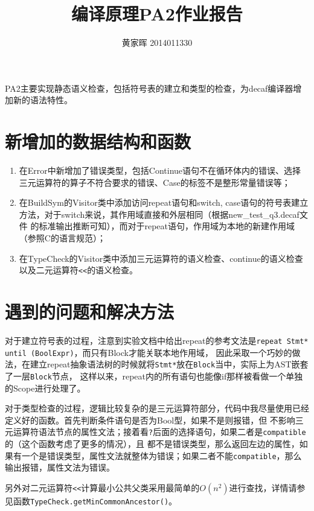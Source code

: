\documentclass[12pt,a4paper]{article}
\title{编译原理PA2作业报告}
\author{黄家晖 2014011330}
\date{}
\begin{document}
\maketitle

PA2主要实现静态语义检查，包括符号表的建立和类型的检查，为decaf编译器增加新的语法特性。

\section{新增加的数据结构和函数}
\begin{enumerate}
\item 在Error中新增加了错误类型，包括Continue语句不在循环体内的错误、选择三元运算符的算子不符合要求的错误、Case的标签不是整形常量错误等；
\item 在BuildSym的Visitor类中添加访问repeat语句和switch, case语句的符号表建立方法，对于switch来说，其作用域直接和外层相同（根据new\_test\_q3.decaf文件
的标准输出推断可知），而对于repeat语句，作用域为本地的新建作用域（参照C的语言规范）；
\item 在TypeCheck的Visitor类中添加三元运算符的语义检查、continue的语义检查以及二元运算符\texttt{<<}的语义检查。

\end{enumerate}

\section{遇到的问题和解决方法}

对于建立符号表的过程，注意到实验文档中给出repeat的参考文法是\texttt{repeat Stmt* until (BoolExpr)}，而只有Block才能关联本地作用域，
因此采取一个巧妙的做法，在建立repeat抽象语法树的时候就将\texttt{Stmt*}放在\texttt{Block}当中，实际上为AST嵌套了一层\texttt{Block}节点，
这样以来，repeat内的所有语句也能像if那样被看做一个单独的Scope进行处理了。

对于类型检查的过程，逻辑比较复杂的是三元运算符部分，代码中我尽量使用已经定义好的函数。首先判断条件语句是否为Bool型，如果不是则报错，但
不影响三元运算符语法节点的属性文法；接着看\texttt{?}后面的选择语句，如果二者是\texttt{compatible}的（这个函数考虑了更多的情况），且
都不是错误类型，那么返回左边的属性，如果有一个是错误类型，属性文法就整体为错误；如果二者不能\texttt{compatible}，那么输出报错，属性文法为错误。

另外对二元运算符\texttt{<<}计算最小公共父类采用最简单的$O(n^2)$进行查找，详情请参见函数\texttt{TypeCheck.getMinCommonAncestor()}。
\end{document}
